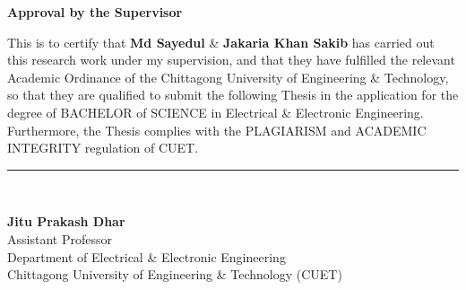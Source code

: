 
\begin{center}
\textbf{\Large{Approval by the Supervisor}}
\end{center}
\vspace{1cm}
This is to certify that \textbf{Md Sayedul} \& \textbf{Jakaria Khan Sakib} has carried out this research work under my supervision, and that they have fulfilled the relevant Academic Ordinance of the Chittagong University of Engineering \& Technology, so that they are qualified to submit the following Thesis in the application for the degree of BACHELOR of SCIENCE in Electrical \& Electronic Engineering. Furthermore, the Thesis complies with the PLAGIARISM and ACADEMIC INTEGRITY regulation of CUET.

\vspace{3cm}

\begin{flushright}
\rule{0.35\columnwidth}{1pt} \\[1.2ex]

{
    
    \textbf{Jitu Prakash Dhar} \\
    Assistant Professor\\
    Department of Electrical \& Electronic Engineering \\
    Chittagong University of Engineering \& Technology (CUET)
}
\end{flushright}
\newpage